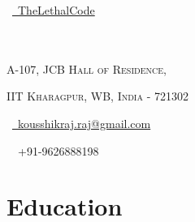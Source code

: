 \documentclass[a4paper,10pt]{extarticle} %
\begin{document}
\pagestyle{empty} %

\begin{multicols}{3}

\normalsize \faGithub\ {\href{https://github.com/TheLethalCode}{\  TheLethalCode}}\\
\normalsize {}\\
\normalsize {}\\
\columnbreak
\normalsize\par{\par} %
\par{\centering\normalsize {\textsc{A-107, JCB Hall of Residence, }}\hfill\par}
\vspace{-0.2cm}
\par{\centering\normalsize {\textsc{IIT Kharagpur, WB, India - 721302 }}\hfill\par}

\columnbreak
\raggedright\hfill\normalsize \faEnvelope\ {\href{mailto:kousshikraj.raj@gmail.com}{\  kousshikraj.raj@gmail.com}}\\
\raggedright\hfill{\faPhone\ \  +91-9626888198}
\end{multicols}


\vspace{-0.4cm}
\section{\textcolor{primary}{Education}}
\end{document}
